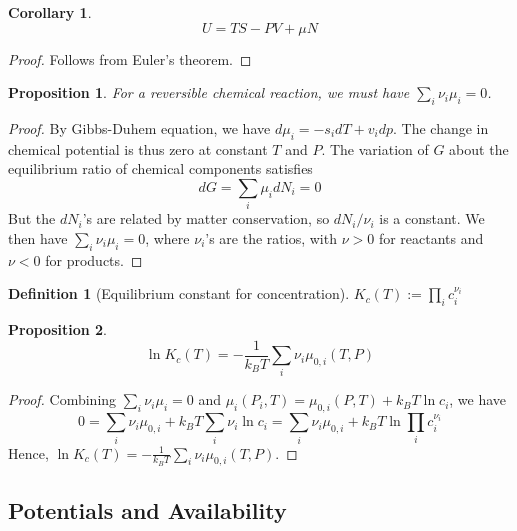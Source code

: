 \documentclass[a4paper]{article}
\theoremstyle{new}
\newtheorem{defi}{Definition}[section]
\newtheorem{prop}{Proposition}[section]
\newtheorem{cor}{Corollary}[section]
\begin{document}
\begin{cor}
$$U=TS-PV+\mu N$$
\end{cor}
\begin{proof}
Follows from Euler's theorem.
\end{proof}
\begin{prop}
For a reversible chemical reaction, we must have $\sum_i\nu_i\mu_i=0$.
\end{prop}
\begin{proof}
By Gibbs-Duhem equation, we have $d\mu_i=-s_idT+v_idp$. The change in chemical potential is thus zero at constant $T$ and $P$. The variation of $G$ about the equilibrium ratio of chemical components satisfies
$$dG=\sum_i\mu_idN_i=0$$
But the $dN_i$'s are related by matter conservation, so $dN_i/\nu_i$ is a constant. We then have $\sum_i\nu_i\mu_i=0$, where $\nu_i$'s are the ratios, with $\nu>0$ for reactants and $\nu<0$ for products. 
\end{proof}
\begin{defi}[Equilibrium constant for concentration]
$K_c(T):=\prod_ic_i^{\nu_i}$
\end{defi}
\begin{prop}
\begin{equation}
\ln K_c(T)=-\frac{1}{k_BT}\sum_i\nu_i\mu_{0,i}(T,P)\label{eqmconst}
\end{equation}
\end{prop}
\begin{proof}
Combining $\sum_i\nu_i\mu_i=0$ and $\mu_i(P_i,T)=\mu_{0,i}(P,T)+k_BT\ln c_i$, we have
$$0=\sum_i\nu_i\mu_{0,i}+k_BT\sum_i\nu_i\ln c_i=\sum_i\nu_i\mu_{0,i}+k_BT\ln\prod_i c_i^{\nu_i}$$
Hence, $\ln K_c(T)=-\frac{1}{k_BT}\sum_i\nu_i\mu_{0,i}(T,P)$.
\end{proof}
\newpage
\subsection{Potentials and Availability}
\end{document}
